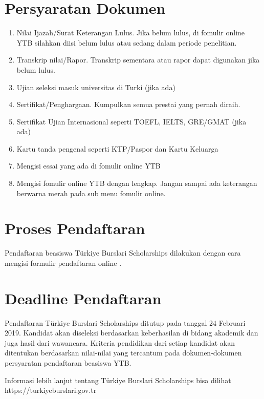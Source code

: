 \section{Persyaratan Dokumen}
\begin{enumerate}
\item Nilai Ijazah/Surat Keterangan Lulus. Jika belum lulus, di fomulir online YTB silahkan diisi belum lulus atau sedang dalam periode penelitian.
\item Transkrip nilai/Rapor. Transkrip sementara atau rapor dapat digunakan jika belum lulus.
\item Ujian seleksi masuk universitas di Turki (jika ada)
\item Sertifikat/Penghargaan. Kumpulkan semua prestai yang pernah diraih.
\item Sertifikat Ujian Internasional seperti TOEFL, IELTS, GRE/GMAT (jika ada)
\item Kartu tanda pengenal seperti KTP/Paspor dan Kartu Keluarga
\item Mengisi essai yang ada di fomulir online YTB
\item Mengisi fomulir online YTB dengan lengkap. Jangan sampai ada keterangan berwarna merah pada sub menu fomulir online.
\end{enumerate}

\section{Proses Pendaftaran}

Pendaftaran beasiswa Türkiye Burslari Scholarships dilakukan dengan cara mengisi formulir pendaftaran online .

\section{Deadline Pendaftaran}

Pendaftaran Türkiye Burslari Scholarships ditutup pada tanggal 24 Februari 2019. Kandidat akan diseleksi berdasarkan keberhasilan di bidang akademik dan juga hasil dari wawancara. Kriteria pendidikan dari setiap kandidat akan ditentukan berdasarkan nilai-nilai yang tercantum pada dokumen-dokumen persyaratan pendaftaran beasiswa YTB.

Informasi lebih lanjut tentang Türkiye Burslari Scholarships bisa dilihat https://turkiyeburslari.gov.tr


